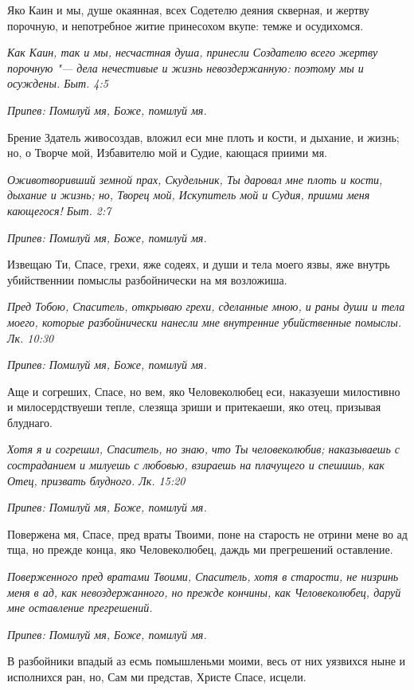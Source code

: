 Яко Каин и мы, душе окаянная, всех Содетелю деяния скверная, и жертву порочную, и непотребное житие принесохом вкупе: темже и осудихомся.


\itshape Как Каин, так и мы, несчастная душа, принесли Создателю всего жертву порочную "--- дела нечестивые и жизнь невоздержанную: поэтому мы и осуждены. Быт. 4:5\normalfont{}


\itshape Припев:\normalfont{} Помилуй мя, Боже, помилуй мя.


Брение Здатель живосоздав, вложил еси мне плоть и кости, и дыхание, и жизнь; но, о Творче мой, Избавителю мой и Судие, кающася приими мя.


\itshape Оживотворивший земной прах, Скудельник, Ты даровал мне плоть и кости, дыхание и жизнь; но, Творец мой, Искупитель мой и Судия, приими меня кающегося! Быт. 2:7\normalfont{}


\itshape Припев:\normalfont{} Помилуй мя, Боже, помилуй мя.


Извещаю Ти, Спасе, грехи, яже содеях, и души и тела моего язвы, яже внутрь убийственнии помыслы разбойнически на мя возложиша.


\itshape Пред Тобою, Спаситель, открываю грехи, сделанные мною, и раны души и тела моего, которые разбойнически нанесли мне внутренние убийственные помыслы. Лк. 10:30\normalfont{}


\itshape Припев:\normalfont{} Помилуй мя, Боже, помилуй мя.


Аще и согреших, Спасе, но вем, яко Человеколюбец еси, наказуеши милостивно и милосердствуеши тепле, слезяща зриши и притекаеши, яко отец, призывая блуднаго.


\itshape Хотя я и согрешил, Спаситель, но знаю, что Ты человеколюбив; наказываешь с состраданием и милуешь с любовью, взираешь на плачущего и спешишь, как Отец, призвать блудного. Лк. 15:20\normalfont{}


\itshape Припев:\normalfont{} Помилуй мя, Боже, помилуй мя.


Повержена мя, Спасе, пред враты Твоими, поне на старость не отрини мене во ад тща, но прежде конца, яко Человеколюбец, даждь ми прегрешений оставление.


\itshape Поверженного пред вратами Твоими, Спаситель, хотя в старости, не низринь меня в ад, как невоздержанного, но прежде кончины, как Человеколюбец, даруй мне оставление прегрешений.\normalfont{}


\itshape Припев:\normalfont{} Помилуй мя, Боже, помилуй мя.


В разбойники впадый аз есмь помышленьми моими, весь от них уязвихся ныне и исполнихся ран, но, Сам ми представ, Христе Спасе, исцели.


